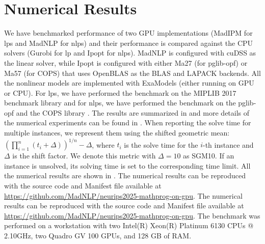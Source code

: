 \documentclass{article}
\begin{document}
\section{Numerical Results}\label{eqn:num}
We have benchmarked performance of two GPU implementations (MadIPM for \glspl*{lp} and MadNLP for \glspl*{nlp}) and their performance is compared against the CPU solvers (Gurobi for \gls*{lp} and Ipopt for \glspl*{nlp}). MadNLP is configured with cuDSS as the linear solver, while Ipopt is configured with either Ma27 (for pglib-opf) or Ma57 (for COPS) that uses OpenBLAS as the BLAS and LAPACK backends. All the nonlinear models are implemented with ExaModels (either running on GPU or CPU). For \glspl*{lp}, we have performed the benchmark on the MIPLIB 2017 benchmark library \cite{gleixnerMIPLIB2017Datadriven2021} and for \glspl*{nlp}, we have performed the benchmark on the pglib-opf \cite{babaeinejadsarookolaeePowerGridLibrary2021} and the COPS library \cite{dolanBenchmarkingOptimizationSoftware2001}. The results are summarized in  and more details of the numerical experiments can be found in . When reporting the solve time for multiple instances, we represent them using the shifted geometric mean: $(\prod_{i=1}^n (t_i + \Delta))^{1/n} - \Delta$, where $t_i$ is the solve time for the $i$-th instance and $\Delta$ is the shift factor. We denote this metric with $\Delta = 10$ as SGM10. If an instance is unsolved, its solving time is set to the corresponding time limit. All the numerical results are shown in . The numerical results can be reproduced with the source code and Manifest file available at \url{https://github.com/MadNLP/neurips2025-mathprog-on-gpu}. The numerical results can be reproduced with the source code and Manifest file available at \url{https://github.com/MadNLP/neurips2025-mathprog-on-gpu}. The benchmark was performed on a workstation with two Intel(R) Xeon(R) Platinum 6130 CPUs @ 2.10GHz, two Quadro GV 100 GPUs, and 128 GB of RAM. 

\begin{table} 
  \footnotesize
  
  \caption{Solve times of CPU solvers (Gurobi and Ipopt) and GPU solvers (MadIPM and MadNLP) in SGM10 (secs; with 900 sec max wall time)  on MIPLIB (\glspl*{lp}), pglib-opf (31 small, 24 medium, and 11 large \glspl*{nlp}), and COPS (13 small, 16 medium, and 16 large \glspl*{nlp})  instances.}\label{tab:results} 
\end{table}
\end{document}
